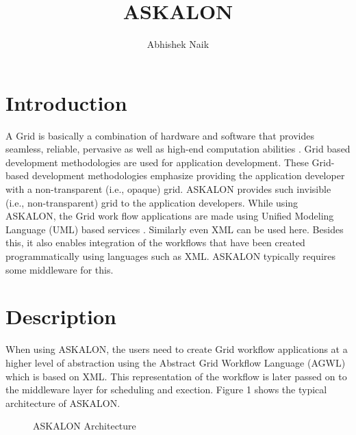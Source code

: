 \documentclass[9pt,twocolumn,twoside]{../../styles/osajnl}
\title{ASKALON}
\author[1,*]{Abhishek Naik}
\affil[1]{School of Informatics and Computing, Bloomington, IN 47408, U.S.A.}
\affil[*]{Corresponding authors: ahnaik@indiana.edu}
\begin{document}
\maketitle

\section{Introduction}

A Grid is basically a combination of hardware and software that
provides seamless, reliable, pervasive as well as high-end computation
abilities \cite{Workflow-book}.  Grid based development methodologies
are used for application development.  These Grid-based development
methodologies emphasize providing the application developer with a
non-transparent (i.e., opaque) grid.  ASKALON provides such invisible
(i.e., non-transparent) grid to the application developers.  While
using ASKALON, the Grid work flow applications are made using Unified
Modeling Language (UML) based services \cite{Workflow-book}.
Similarly even XML can be used here.  Besides this, it also enables
integration of the workflows that have been created programmatically
using languages such as XML.  ASKALON typically requires some
middleware for this.

\section{Description}

When using ASKALON, the users need to create Grid workflow
applications at a higher level of abstraction using the Abstract Grid
Workflow Language (AGWL) which is based on XML.  This representation
of the workflow is later passed on to the middleware layer for
scheduling and exection.  Figure 1 shows the typical architecture of
ASKALON.

\begin{figure}[htbp]
  \centering
  \caption{ASKALON Architecture \cite{Workflow-book}}
\end{figure}
\end{document}
